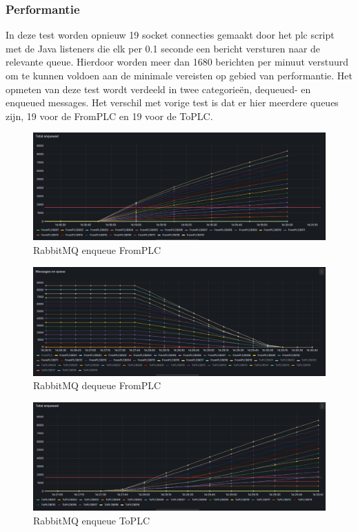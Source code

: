 \subsubsection{Performantie}
In deze test worden opnieuw 19 socket connecties gemaakt door het plc script met de Java listeners die elk per 0.1 seconde een bericht versturen naar de relevante queue.
Hierdoor worden meer dan 1680 berichten per minuut verstuurd om te kunnen voldoen aan de minimale vereisten op gebied van performantie.
Het opmeten van deze test wordt verdeeld in twee categorieën, dequeued- en enqueued messages.
Het verschil met vorige test is dat er hier meerdere queues zijn, 19 voor de FromPLC en 19 voor de ToPLC. 

\begin{figure}[h!]
  \centering
  \includegraphics[width=.95\textwidth]{img/rabbitmq-enqueue-count-FromPLC.png}
  \caption{\label{fig:rabbitmq_enqueue_fromplc_count}RabbitMQ enqueue FromPLC}
\end{figure}

\begin{figure}[h!]
  \centering
  \includegraphics[width=.95\textwidth]{img/rabbitmq-dequeue-count-FromPLC.png}
  \caption{\label{fig:rabbitmq_dequeue_fromplc_count}RabbitMQ dequeue FromPLC}
\end{figure}

\begin{figure}[h!]
  \centering
  \includegraphics[width=.95\textwidth]{img/rabbitmq-enqueue-count-ToPLC.png}
  \caption{\label{fig:rabbitmq_enqueue_toplc_count}RabbitMQ enqueue ToPLC}
\end{figure}

